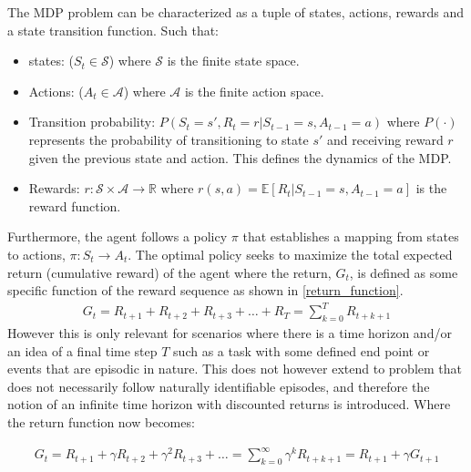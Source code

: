 The MDP problem can be characterized as a tuple of states, actions, rewards and a state transition function. Such that:

\begin{itemize}
	\item states: ($S_t\in \mathcal{S}$) where $\mathcal{S}$ is the finite state space.
	\item Actions: ($A_t \in \mathcal{A}$) where $\mathcal{A}$ is the finite action space.
	\item Transition probability: $P(S_{t} = s',R_{t} = r | S_{t-1} = s, A_{t-1} = a)$ where $P(\cdot)$ represents the probability of transitioning to state $s'$ and receiving reward $r$ given the previous state and action. This defines the dynamics of the MDP.
	\item Rewards: $r:\mathcal{S}\times \mathcal{A} \rightarrow \mathbb{R}$ where $r(s,a) = \mathbb{E}[R_{t}| S_{t-1} =s, A_{t-1} = a]$  is the reward function.
\end{itemize}


Furthermore, the agent follows a policy $\pi$ that establishes a mapping from states to actions, $\pi: S_t \rightarrow A_t$. The optimal policy seeks to maximize the total expected return (cumulative reward) of the agent where the return, $G_t$, is defined as some specific function of the reward sequence \cite{suttonReinforcementLearningIntroduction2014} as shown in \autoref{return_function}. 
\begin{equation}
	\begin{aligned}
		G_t  = R_{t+1} + R_{t+2} + R_{t+3} + \dots + R_{T} = \sum_{k=0}^TR_{t+k+1}
	\end{aligned}
	\label{return_function}
\end{equation}
However this is only relevant for scenarios where there is a time horizon and/or an idea of a final time step $T$ such as a task with some defined end point or events that are episodic in nature. This does not however extend to problem that does not necessarily follow naturally identifiable episodes, and therefore the notion of an infinite time horizon with discounted returns is introduced. Where the return function now becomes:

\begin{equation} \label{eq:total-return}
	\begin{aligned}
		G_t  = R_{t+1} + \gamma R_{t+2} + \gamma^2 R_{t+3} + \dots = \sum_{k=0}^\infty \gamma^k R_{t+k+1} = R_{t+1} + \gamma G_{t+1}
	\end{aligned}
\end{equation}

